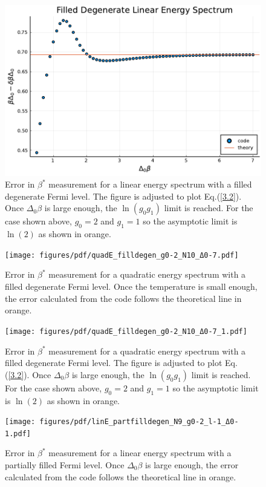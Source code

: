 \begin{figure}[H]
    \centering
    \includegraphics[scale=0.75]{figures/pdf/linE_filldegen_g0-2_N10_1.pdf}
    \caption{Error in $\beta^*$ measurement for a linear energy spectrum with a filled
degenerate Fermi level. The figure is adjusted to plot Eq.\@ (\ref{3.2}). Once $\Delta_0\beta$ is large enough, the $\ln(g_0g_1)$ limit is reached. For the case shown above, $g_0=2$ and $g_1=1$ so the asymptotic limit is $\ln(2)$ as shown in orange.}
    \label{fig:FilledDegenerateLinearSpectrumAdjustedError}
\end{figure}
\begin{figure}[H]
    \centering
    \texttt{[image: figures/pdf/quadE\_filldegen\_g0-2\_N10\_Δ0-7.pdf]}
    \caption{Error in $\beta^*$ measurement for a quadratic energy spectrum with a filled
degenerate Fermi level. Once the temperature is small enough, the error calculated from the code
follows the theoretical line in orange.}
    \label{fig:FilledDegenerate}
\end{figure}
\begin{figure}[H]
    \centering
    \texttt{[image: figures/pdf/quadE\_filldegen\_g0-2\_N10\_Δ0-7\_1.pdf]}
    \caption{Error in $\beta^*$ measurement for a quadratic energy spectrum with a filled
degenerate Fermi level. The figure is adjusted to plot Eq.\@ (\ref{3.2}). Once $\Delta_0\beta$ is large enough, the $\ln(g_0g_1)$ limit is reached. For the case shown above, $g_0=2$ and $g_1=1$ so the asymptotic limit is $\ln(2)$ as shown in orange.}
    \label{fig:FilledDegenerate2}
\end{figure}
\begin{figure}[H]
    \centering
    \texttt{[image: figures/pdf/linE\_partfilldegen\_N9\_g0-2\_l-1\_Δ0-1.pdf]}
    \caption{Error in $\beta^*$ measurement for a linear energy spectrum with a partially filled Fermi level. Once $\Delta_0\beta$ is large enough, the error calculated from the code follows the theoretical line in orange.}
    \label{fig:PartiallyFilledDegenerateLinearSpectrum}
\end{figure}
